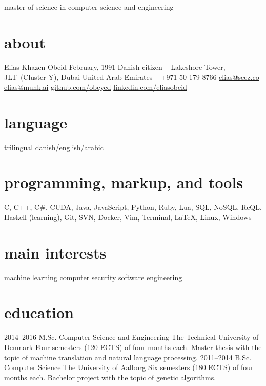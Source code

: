 \documentclass[]{friggeri-cv}
\begin{document}
    {master of science in computer science and engineering}

\begin{aside}
  \section{about}
    Elias Khazen Obeid
    February, 1991
    Danish citizen
    ~
    Lakeshore Tower, JLT~(Cluster Y), Dubai
    United Arab Emirates
    ~
    +971 50 179 8766
    \href{mailto:elias@seez.co}{elias@seez.co}
    \href{mailto:elias@munk.ai}{elias@munk.ai}
    \href{https://github.com/obeyed}{github.com/obeyed}
    \href{https://www.linkedin.com/in/eliasobeid}{linkedin.com/eliasobeid}
  \section{language}
    trilingual danish/english/arabic
  \section{programming, markup, and tools}
    C, C++, C\#, CUDA, Java, JavaScript, Python, Ruby, Lua, 
    SQL, NoSQL, ReQL, 
    Haskell (learning),
    Git, SVN, Docker, Vim, Terminal, \LaTeX{}, Linux, Windows
  \section{main interests}
    machine learning
    computer security
    software engineering
\end{aside}

\section{education}

\begin{entrylist}
  \entry
    {2014--2016}
    {M.Sc. {\normalfont Computer Science and Engineering}}
    {The Technical University of Denmark}
    {Four semesters (120 ECTS) of four months each.
	Master thesis with the topic of machine translation and natural language processing.}
  \entry
    {2011--2014}
    {B.Sc. {\normalfont Computer Science}}
    {The University of Aalborg}
    {Six semesters (180 ECTS) of four months each.
	Bachelor project with the topic of genetic algorithms.}
\end{entrylist}
\end{document}
